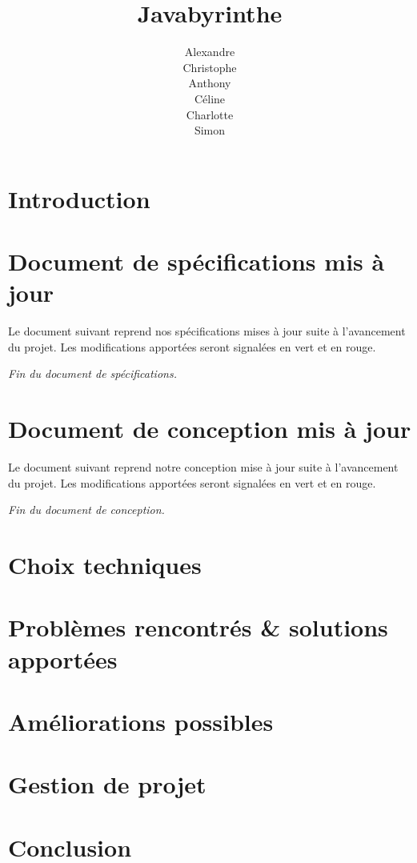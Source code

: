 \documentclass{scrreprt}
\title{Javabyrinthe}
\author{Alexandre \bsc{Brehmer}\\ Christophe \bsc{Cluizel} \\ Anthony \bsc{Courtin} \\ Céline \bsc{Leduc} \\ Charlotte \bsc{Touchard} \\ Simon \bsc{Wallon}}
\begin{document}

\tableofcontents

\chapter{Introduction}
	

\chapter{Document de spécifications mis à jour}
  Le document suivant reprend nos spécifications mises à jour suite à l'avancement du projet. Les modifications apportées seront signalées en vert et en rouge.
	
  \emph{Fin du document de spécifications.}

\chapter{Document de conception mis à jour}
  Le document suivant reprend notre conception mise à jour suite à l'avancement du projet. Les modifications apportées seront signalées en vert et en rouge.
	
  \emph{Fin du document de conception.}

\chapter{Choix techniques}
	

\chapter{Problèmes rencontrés \& solutions apportées}
  

\chapter{Améliorations possibles}
	

\chapter{Gestion de projet}
	

\chapter{Conclusion}

\end{document}
